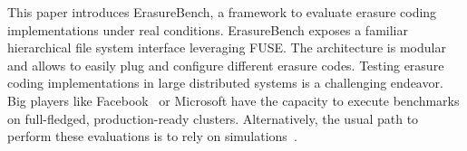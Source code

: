 



This paper introduces ErasureBench, a framework to evaluate erasure coding implementations under real conditions. 
ErasureBench exposes a familiar hierarchical file system interface leveraging FUSE.
The architecture is modular and allows to easily plug and configure different erasure codes.
Testing erasure coding implementations in large distributed systems is a challenging endeavor.
Big players like Facebook~\autocite{XorbasVLDB} or Microsoft \cite{DBLP:conf/usenix/HuangSXOCG0Y12} have the capacity to execute benchmarks on full-fledged, production-ready clusters.
Alternatively, the usual path to perform these evaluations is to rely on  simulations~\autocite{Silberstein2014}. 

